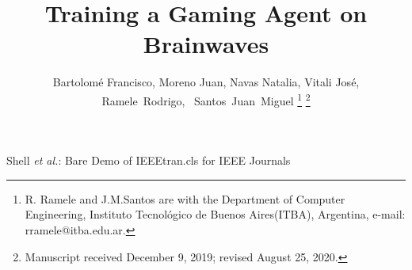 \documentclass[journal]{IEEEtran}
\begin{document}
%
\title{Training a Gaming Agent on Brainwaves}
%
%
%

\author{Bartolomé Francisco, Moreno Juan,  Navas Natalia, Vitali José, \\
Ramele~Rodrigo,~
        Santos~Juan~Miguel%
\thanks{R. Ramele and J.M.Santos are with the Department
of Computer Engineering, Instituto Tecnológico de Buenos Aires(ITBA), Argentina,
e-mail: rramele@itba.edu.ar.}%
\thanks{Manuscript received December 9, 2019; revised August 25, 2020.}}

%
%



%
{Shell \MakeLowercase{\textit{et al.}}: Bare Demo of IEEEtran.cls for IEEE Journals}
%
\end{document}
